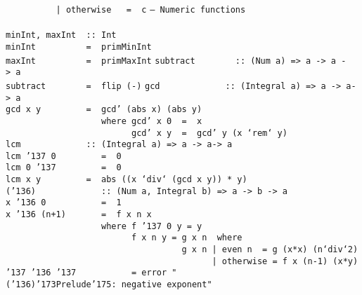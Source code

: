 \mbox{\tt \ \ \ \ \ \ \ \ \ \ |\ otherwise\ \ \ =\ \ c}
\eprogB\noindent\bprogB
\mbox{\tt --\ Numeric\ functions}\\
\mbox{\tt }\\[-8pt]
\mbox{\tt minInt,\ maxInt\ \ ::\ Int}\\
\mbox{\tt minInt\ \ \ \ \ \ \ \ \ \ =\ \ primMinInt}\\
\mbox{\tt maxInt\ \ \ \ \ \ \ \ \ \ =\ \ primMaxInt}
%
%
\eprogB\noindent\bprogB
\mbox{\tt subtract\ \ \ \ \ \ \ \ ::\ (Num\ a)\ =>\ a\ ->\ a\ ->\ a}\\
\mbox{\tt subtract\ \ \ \ \ \ \ \ =\ \ flip\ (-)}
%
\eprogB\noindent\bprogB
\mbox{\tt gcd\ \ \ \ \ \ \ \ \ \ \ \ \ ::\ (Integral\ a)\ =>\ a\ ->\ a->\ a}\\
\mbox{\tt gcd\ x\ y\ \ \ \ \ \ \ \ \ =\ \ gcd'\ (abs\ x)\ (abs\ y)}\\
\mbox{\tt \ \ \ \ \ \ \ \ \ \ \ \ \ \ \ \ \ \ \ where\ gcd'\ x\ 0\ \ =\ \ x}\\
\mbox{\tt \ \ \ \ \ \ \ \ \ \ \ \ \ \ \ \ \ \ \ \ \ \ \ \ \ gcd'\ x\ y\ \ =\ \ gcd'\ y\ (x\ `rem`\ y)}
%
\eprogB\noindent\bprogB
\mbox{\tt lcm\ \ \ \ \ \ \ \ \ \ \ \ \ ::\ (Integral\ a)\ =>\ a\ ->\ a->\ a}\\
\mbox{\tt lcm\ {\char'137}\ 0\ \ \ \ \ \ \ \ \ =\ \ 0}\\
\mbox{\tt lcm\ 0\ {\char'137}\ \ \ \ \ \ \ \ \ =\ \ 0}\\
\mbox{\tt lcm\ x\ y\ \ \ \ \ \ \ \ \ =\ \ abs\ ((x\ `div`\ (gcd\ x\ y))\ *\ y)}
%
\eprogB\noindent\bprogB
\mbox{\tt ({\char'136})\ \ \ \ \ \ \ \ \ \ \ \ \ ::\ (Num\ a,\ Integral\ b)\ =>\ a\ ->\ b\ ->\ a}\\
\mbox{\tt x\ {\char'136}\ 0\ \ \ \ \ \ \ \ \ \ \ =\ \ 1}\\
\mbox{\tt x\ {\char'136}\ (n+1)\ \ \ \ \ \ \ =\ \ f\ x\ n\ x}\\
\mbox{\tt \ \ \ \ \ \ \ \ \ \ \ \ \ \ \ \ \ \ \ where\ f\ {\char'137}\ 0\ y\ =\ y}\\
\mbox{\tt \ \ \ \ \ \ \ \ \ \ \ \ \ \ \ \ \ \ \ \ \ \ \ \ \ f\ x\ n\ y\ =\ g\ x\ n\ \ where}\\
\mbox{\tt \ \ \ \ \ \ \ \ \ \ \ \ \ \ \ \ \ \ \ \ \ \ \ \ \ \ \ \ \ \ \ \ \ \ \ g\ x\ n\ |\ even\ n\ \ =\ g\ (x*x)\ (n`div`2)}\\
\mbox{\tt \ \ \ \ \ \ \ \ \ \ \ \ \ \ \ \ \ \ \ \ \ \ \ \ \ \ \ \ \ \ \ \ \ \ \ \ \ \ \ \ \ |\ otherwise\ =\ f\ x\ (n-1)\ (x*y)}\\
\mbox{\tt {\char'137}\ {\char'136}\ {\char'137}\ \ \ \ \ \ \ \ \ \ \ =\ error\ "({\char'136}){\char'173}Prelude{\char'175}:\ negative\ exponent"}
